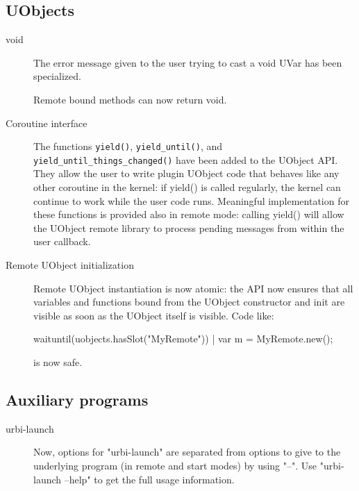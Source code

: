 \subsection{UObjects}

\begin{description}
\item[void]
The error message given to the user trying to cast a void UVar has been
specialized.

Remote bound methods can now return void.


\item[Coroutine interface]

  The functions \lstinline|yield()|, \lstinline|yield_until()|, and
  \lstinline|yield_until_things_changed()| have been added to the
  UObject API. They allow the user to write plugin UObject code that
  behaves like any other coroutine in the kernel: if yield() is called
  regularly, the kernel can continue to work while the user code runs.
  Meaningful implementation for these functions is provided also in
  remote mode: calling yield() will allow the UObject remote library
  to process pending messages from within the user callback.

\item[Remote UObject initialization]

  Remote UObject instantiation is now atomic: the API now ensures that
  all variables and functions bound from the UObject constructor and
  init are visible as soon as the UObject itself is visible. Code
  like:

\begin{urbiunchecked}
waituntil(uobjects.hasSlot("MyRemote")) | var m = MyRemote.new();
\end{urbiunchecked}

is now safe.
\end{description}

\subsection{Auxiliary programs}

\begin{description}
\item[urbi-launch] Now, options for "urbi-launch" are separated from
  options to give to the underlying program (in remote and start
  modes) by using "--". Use "urbi-launch --help" to get the full usage
  information.
\end{description}



